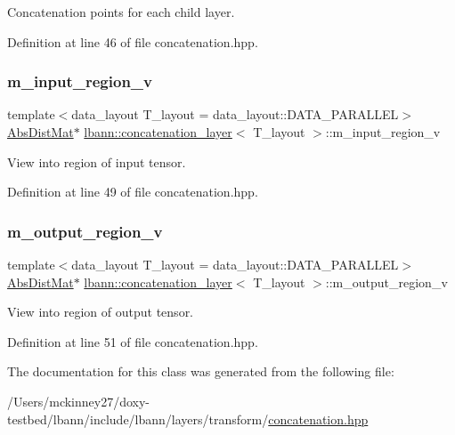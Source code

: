 Concatenation points for each child layer. 

Definition at line 46 of file concatenation.\+hpp.

\mbox{\label{classlbann_1_1concatenation__layer_afa68f2e5d3ea2de57f4974a37c01fc7b}} 
\subsubsection{\texorpdfstring{m\+\_\+input\+\_\+region\+\_\+v}{m\_input\_region\_v}}
{\footnotesize\ttfamily template$<$data\+\_\+layout T\+\_\+layout = data\+\_\+layout\+::\+D\+A\+T\+A\+\_\+\+P\+A\+R\+A\+L\+L\+EL$>$ \\
\hyperlink{base_8hpp_a9a697a504ae84010e7439ffec862b470}{Abs\+Dist\+Mat}$\ast$ \hyperlink{classlbann_1_1concatenation__layer}{lbann\+::concatenation\+\_\+layer}$<$ T\+\_\+layout $>$\+::m\+\_\+input\+\_\+region\+\_\+v\hspace{0.3cm}{\ttfamily [private]}}

View into region of input tensor. 

Definition at line 49 of file concatenation.\+hpp.

\mbox{\label{classlbann_1_1concatenation__layer_af141bf9cf1569121a65a68e4ae97855c}} 
\subsubsection{\texorpdfstring{m\+\_\+output\+\_\+region\+\_\+v}{m\_output\_region\_v}}
{\footnotesize\ttfamily template$<$data\+\_\+layout T\+\_\+layout = data\+\_\+layout\+::\+D\+A\+T\+A\+\_\+\+P\+A\+R\+A\+L\+L\+EL$>$ \\
\hyperlink{base_8hpp_a9a697a504ae84010e7439ffec862b470}{Abs\+Dist\+Mat}$\ast$ \hyperlink{classlbann_1_1concatenation__layer}{lbann\+::concatenation\+\_\+layer}$<$ T\+\_\+layout $>$\+::m\+\_\+output\+\_\+region\+\_\+v\hspace{0.3cm}{\ttfamily [private]}}

View into region of output tensor. 

Definition at line 51 of file concatenation.\+hpp.



The documentation for this class was generated from the following file\+:\begin{DoxyCompactItemize}
\item 
/\+Users/mckinney27/doxy-\/testbed/lbann/include/lbann/layers/transform/\hyperlink{concatenation_8hpp}{concatenation.\+hpp}\end{DoxyCompactItemize}
